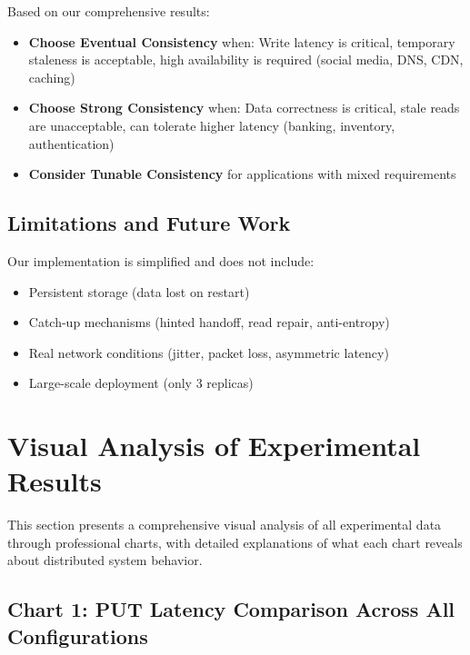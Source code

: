 \documentclass[10pt,a4paper]{article}
\begin{document}
Based on our comprehensive results:

\begin{itemize}
    \item \textbf{Choose Eventual Consistency} when: Write latency is critical, temporary staleness is acceptable, high availability is required (social media, DNS, CDN, caching)
    \item \textbf{Choose Strong Consistency} when: Data correctness is critical, stale reads are unacceptable, can tolerate higher latency (banking, inventory, authentication)
    \item \textbf{Consider Tunable Consistency} for applications with mixed requirements
\end{itemize}

\subsection{Limitations and Future Work}

Our implementation is simplified and does not include:
\begin{itemize}
    \item Persistent storage (data lost on restart)
    \item Catch-up mechanisms (hinted handoff, read repair, anti-entropy)
    \item Real network conditions (jitter, packet loss, asymmetric latency)
    \item Large-scale deployment (only 3 replicas)
\end{itemize}

\newpage
\section{Visual Analysis of Experimental Results}

This section presents a comprehensive visual analysis of all experimental data through professional charts, with detailed explanations of what each chart reveals about distributed system behavior.

\subsection{Chart 1: PUT Latency Comparison Across All Configurations}
\end{document}

